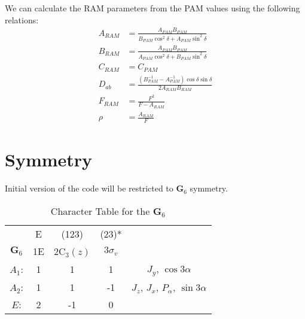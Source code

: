 \documentclass{article}
\begin{document}
We can calculate the RAM parameters from the PAM values using the following relations:
\begin{align}
	A_{RAM} &= \frac{A_{PAM}B_{PAM}}{B_{PAM}\cos^{2}\delta + A_{PAM}\sin^{2}\delta} \\
	B_{RAM} &= \frac{A_{PAM}B_{PAM}}{A_{PAM}\cos^{2}\delta + B_{PAM}\sin^{2}\delta} \\
	C_{RAM} &= C_{PAM} \\
	D_{ab} &= \frac{(B_{PAM}^{-1} - A_{PAM}^{-1})\cos\delta\sin\delta}{2A_{RAM}B_{RAM}}\\
	F_{RAM} &= \frac{F^{2}}{F-A_{RAM}} \\
	\rho &= \frac{A_{RAM}}{F}
\end{align}

\section{Symmetry}
Initial version of the code will be restricted to $\mathbf{G}_{6}$ symmetry. 
\begin{table}[H]
	\centering
	\caption{Character Table for the $\mathbf{G}_{6}$}
	\begin{tabular}{c c c c c}
		\hline
		& E & (123) & (23)* & \\
		$\mathbf{G}_{6}$ & 1E & 2C$_{3}(z)$ & $3\sigma_{v}$ & \\
		\hline
		$A_{1}$: & 1 & 1 & 1 & $J_{y}$, $\cos3\alpha$ \\
		$A_{2}$: & 1 & 1 & -1 & $J_{z}$, $J_{x}$, $P_{\alpha}$, $\sin3\alpha$ \\
		$E$: & 2 & -1 & 0 & \\
		\hline
	\end{tabular}
\end{table}
\end{document}
